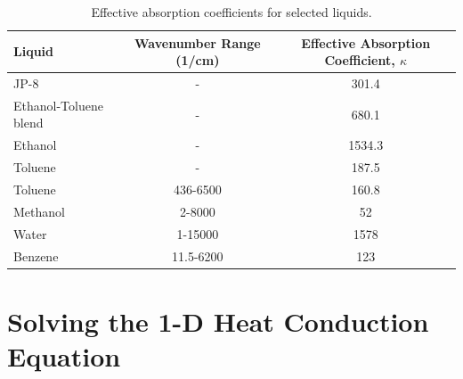 \begin{table}[ht]
\caption[Effective absorption coefficients for selected liquids]{Effective absorption coefficients for selected liquids.}
\centering
\begin{tabular}{l c c}
\hline\hline
Liquid                                              & Wavenumber Range (\si{1/\cm})  & Effective Absorption Coefficient, $\kappa$    \\ \hline
JP-8 \cite{Suo-Anttila:PCT2009}                     &  -                             & 301.4                                         \\
Ethanol-Toluene blend \cite{Suo-Anttila:PCT2009}    &  -                             & 680.1                                         \\
Ethanol \cite{Suo-Anttila:PCT2009}                  &  -                             & 1534.3                                        \\
Toluene \cite{Suo-Anttila:PCT2009}                  &  -                             & 187.5                                         \\
Toluene \cite{Bertie:AS1994a}                       &  436-6500                      & 160.8                                         \\
Methanol\cite{Bertie:AS1993a}                       &  2-8000                        & 52                                            \\
Water   \cite{Bertie:AS1996}                        &  1-15000                       & 1578                                          \\
Benzene \cite{Bertie:AS1993b}                       &  11.5-6200                     & 123                                           \\ \hline
\end{tabular}
\label{tbl_abscoeff}
\end{table}




\chapter{Solving the 1-D Heat Conduction Equation}
\label{solid-phase-discretization}


